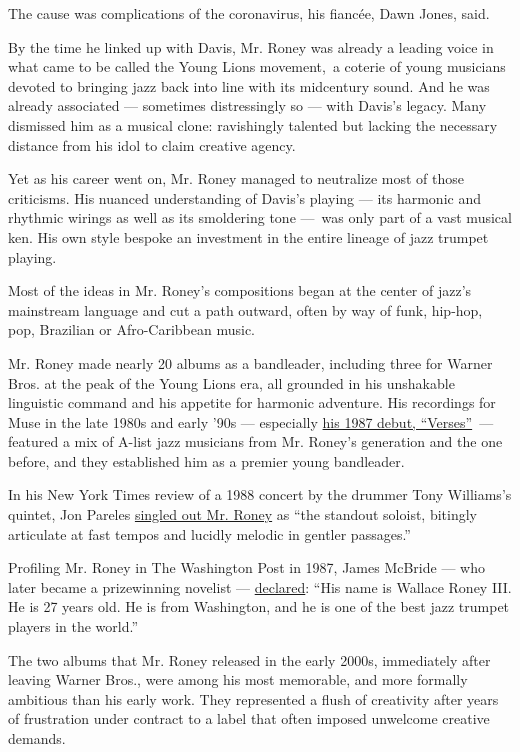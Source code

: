 The cause was complications of the coronavirus, his fiancée, Dawn Jones,
said.

By the time he linked up with Davis, Mr. Roney was already a leading
voice in what came to be called the Young Lions movement,~a coterie of
young musicians devoted to bringing jazz back into line with its
midcentury sound. And he was already associated --- sometimes
distressingly so --- with Davis's legacy. Many dismissed him as a
musical clone: ravishingly talented but lacking the necessary distance
from his idol to claim creative agency.

Yet as his career went on, Mr. Roney managed to neutralize most of those
criticisms. His nuanced understanding of Davis's playing --- its
harmonic and rhythmic wirings as well as its smoldering tone ---~was
only part of a vast musical ken. His own style bespoke an investment in
the entire lineage of jazz trumpet playing.

Most of the ideas in Mr. Roney's compositions began at the center of
jazz's mainstream language and cut a path outward, often by way of funk,
hip-hop, pop, Brazilian or Afro-Caribbean music.

Mr. Roney made nearly 20 albums as a bandleader, including three for
Warner Bros. at the peak of the Young Lions era, all grounded in his
unshakable linguistic command and his appetite for harmonic adventure.
His recordings for Muse in the late 1980s and early '90s --- especially
\href{https://www.youtube.com/watch?v=DJvapwO30Ms}{his 1987 debut,
``Verses''}~--- featured a mix of A-list jazz musicians from Mr. Roney's
generation and the one before, and they established him as a premier
young bandleader.

In his New York Times review of a 1988 concert by the drummer Tony
Williams's quintet, Jon Pareles
\href{https://www.nytimes3xbfgragh.onion/1988/03/26/arts/review-jazz-a-drummer-who-goads-the-soloists.html}{singled
out Mr. Roney} as ``the standout soloist, bitingly articulate at fast
tempos and lucidly melodic in gentler passages.''

Profiling Mr. Roney in The Washington Post in 1987, James McBride ---
who later became a prizewinning novelist ---
\href{https://www.washingtonpost.com/archive/lifestyle/1987/12/12/wallace-roney-and-the-quest-to-be-heard/8d34f342-850e-49e6-91ac-641832df07d1/}{declared}:
``His name is Wallace Roney III. He is 27 years old. He is from
Washington, and he is one of the best jazz trumpet players in the
world.''

The two albums that Mr. Roney released in the early 2000s, immediately
after leaving Warner Bros., were among his most memorable, and more
formally ambitious than his early work. They represented a flush of
creativity after years of frustration under contract to a label that
often imposed unwelcome creative demands.

